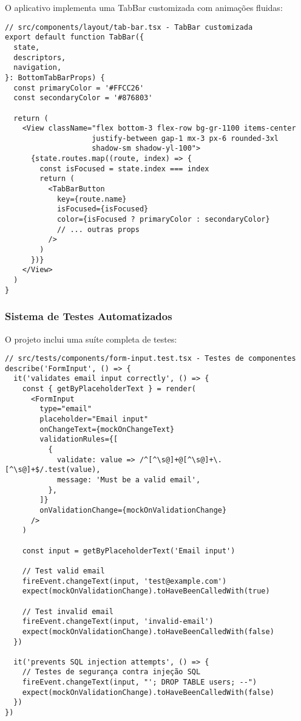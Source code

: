 O aplicativo implementa uma TabBar customizada com animações fluidas:

\begin{verbatim}
// src/components/layout/tab-bar.tsx - TabBar customizada
export default function TabBar({
  state,
  descriptors,
  navigation,
}: BottomTabBarProps) {
  const primaryColor = '#FFCC26'
  const secondaryColor = '#876803'
  
  return (
    <View className="flex bottom-3 flex-row bg-gr-1100 items-center 
                    justify-between gap-1 mx-3 px-6 rounded-3xl 
                    shadow-sm shadow-yl-100">
      {state.routes.map((route, index) => {
        const isFocused = state.index === index
        return (
          <TabBarButton
            key={route.name}
            isFocused={isFocused}
            color={isFocused ? primaryColor : secondaryColor}
            // ... outras props
          />
        )
      })}
    </View>
  )
}
\end{verbatim}

\subsubsection{Sistema de Testes Automatizados}

O projeto inclui uma suíte completa de testes:

\begin{verbatim}
// src/tests/components/form-input.test.tsx - Testes de componentes
describe('FormInput', () => {
  it('validates email input correctly', () => {
    const { getByPlaceholderText } = render(
      <FormInput
        type="email"
        placeholder="Email input"
        onChangeText={mockOnChangeText}
        validationRules={[
          {
            validate: value => /^[^\s@]+@[^\s@]+\.[^\s@]+$/.test(value),
            message: 'Must be a valid email',
          },
        ]}
        onValidationChange={mockOnValidationChange}
      />
    )
    
    const input = getByPlaceholderText('Email input')
    
    // Test valid email
    fireEvent.changeText(input, 'test@example.com')
    expect(mockOnValidationChange).toHaveBeenCalledWith(true)
    
    // Test invalid email
    fireEvent.changeText(input, 'invalid-email')
    expect(mockOnValidationChange).toHaveBeenCalledWith(false)
  })
  
  it('prevents SQL injection attempts', () => {
    // Testes de segurança contra injeção SQL
    fireEvent.changeText(input, "'; DROP TABLE users; --")
    expect(mockOnValidationChange).toHaveBeenCalledWith(false)
  })
})
\end{verbatim}

